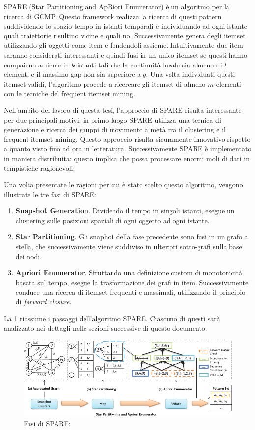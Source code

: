 SPARE (Star Partitioning and ApRiori Enumerator) è un algoritmo per la ricerca di GCMP. 
Questo framework realizza la ricerca di questi pattern suddividendo lo spazio-tempo in istanti temporali e individuando ad ogni istante quali traiettorie risultino vicine e quali no.
Successivamente genera degli itemset utilizzando gli oggetti come item e fondendoli assieme.
Intuitivamente due item saranno considerati interessanti e quindi fusi in un unico itemset se questi hanno compaiono assieme in \(k\) istanti tali che la continuità locale sia almeno di \(l\) elementi e il massimo gap non sia superiore a \(g\).
Una volta individuati questi itemset validi, l'algoritmo procede a ricercare gli itemset di almeno \(m\) elementi con le tecniche del frequent itemset mining.

Nell'ambito del lavoro di questa tesi, l'approccio di SPARE risulta interessante per due principali motivi: 
in primo luogo SPARE utilizza una tecnica di generazione e ricerca dei gruppi di movimento a metà tra il clustering e il frequent itemset mining.
Questo approccio risulta sicuramente innovativo rispetto a quanto visto fino ad ora in letteratura.
Successivamente SPARE è implementato in maniera distribuita: questo implica che possa processare enormi moli di dati in tempistiche ragionevoli.

Una volta presentate le ragioni per cui è stato scelto questo algoritmo, vengono illustrate le tre fasi di SPARE:

\begin{enumerate}
    \item \textbf{Snapshot Generation}.
    Dividendo il tempo in singoli istanti, esegue un clustering sulle posizioni spaziali di ogni oggetto ad ogni istante.
    \item \textbf{Star Partitioning}.
    Gli snaphot della fase precedente sono fusi in un grafo a stella, che successivamente viene suddiviso in ulteriori sotto-grafi sulla base
    dei nodi.
    \item \textbf{Apriori Enumerator}.
    Sfruttando una definizione custom di monotonicità basata sul tempo, esegue la trasformazione dei grafi in item.
    Successivamente conduce una ricerca di itemset frequenti e massimali, utilizzando il principio di \textit{forward closure}.
\end{enumerate}

La \cref{fig:chap-2:spare-workflow} riassume i passaggi dell'algoritmo SPARE.
Ciascuno di questi sarà analizzato nei dettagli nelle sezioni successive di questo documento.

\begin{figure}
    \centering
    \includegraphics[width=\textwidth]{res/fig/sec-2/GCMPWorkFlow.pdf}
    \caption{Fasi di SPARE: \cite{DBLP:journals/pvldb/FanZWT16}}%
    \label{fig:chap-2:spare-workflow}
\end{figure}



